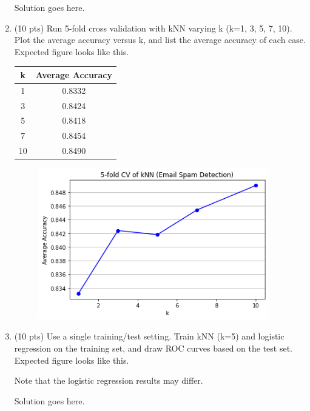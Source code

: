 \documentclass[a4paper]{article}
\theoremstyle{definition}
\newenvironment{soln}{
    \leavevmode\color{blue}\ignorespaces
}{}
\begin{document}
\begin{enumerate}
	\begin{soln}  Solution goes here. \end{soln}
	
	\item (10 pts) Run 5-fold cross validation with kNN varying k (k=1, 3, 5, 7, 10). Plot the average accuracy versus k, and list the average accuracy of each case. \\
	Expected figure looks like this.
	\begin{figure}[h]
		\centering
	\end{figure}
	
	\begin{soln}
		\begin{center}
			\begin{tabular}{ c  c }
				\hline
				k & Average Accuracy \\ \hline
				1 & 0.8332 \\
				3 & 0.8424 \\
				5 & 0.8418 \\
				7 & 0.8454 \\
				10 & 0.8490 \\
				\hline
			\end{tabular}
			\begin{figure}[h]
				\includegraphics[width=100mm]{email_spam_cv_k_varies.png}
			\end{figure}
		\end{center}
	\end{soln}
	
	\item (10 pts) Use a single training/test setting. Train kNN (k=5) and logistic regression on the training set, and draw ROC curves based on the test set. \\
	Expected figure looks like this.
	\begin{figure}[h]
		\centering
	\end{figure}
	Note that the logistic regression results may differ.
	
	\begin{soln}  Solution goes here. \end{soln}
	
\end{enumerate}

\end{document}
